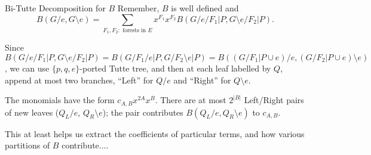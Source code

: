 \documentclass{beamer}
\begin{document}
\begin{frame}{Bi-Tutte Decomposition for $B$}
Remember, $B$ is well defined and 
\[
B(G/e,G\!\setminus\! e)=\sum_{F_1,F_2:\text{ forests in }E} x^{F_1}x^{F_2}
B(G/e/F_1|P,G\!\setminus\! e/F_2|P).
\]

Since $B(G/e/F_1|P,G\!\setminus\! e/F_2|P)=
B(G/F_1/e|P,G/F_2\!\setminus\! e|P)=
B((G/F_1|P\cup e)/e,(G/F_2|P\cup e)\!\setminus\!e)$,
we can use  $\{p,q,e\}$-ported Tutte tree,
and then at each leaf labelled by $Q$, append at most
two branches, ``Left'' for $Q/e$ and ``Right'' for 
$Q\setminus e$.

The monomials have the form $c_{A,B}x^{2A}x^B$.
There are at most $2^{|B|}$ Left/Right pairs of 
new leaves ($Q_L/e$, $Q_R\setminus e$); the pair
contributes $B(Q_L/e,Q_R\setminus e)$ to $c_{A,B}$.

This at least helps us extract the coefficients of
particular terms, and how various partitions of
$B$ contribute....
\end{frame}
\end{document}
